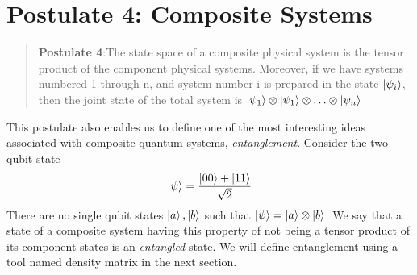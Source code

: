 \section{Postulate 4: Composite Systems}
\begin{quote}
    \textbf{Postulate 4}:The state space of a composite physical system is the tensor product of the component physical systems. Moreover, if we have systems numbered 1 through n, and system number i is prepared in the state $\ket{\psi_i}$, then the joint state of the total system is $\ket{\psi_1} \otimes \ket{\psi_1} \otimes \hdots \otimes \ket{\psi_n}$
\end{quote}

This postulate also enables us to define one of the most interesting ideas associated with composite quantum systems, \textit{entanglement}. Consider the two qubit state 
\begin{equation}
    \ket{\psi}=\frac{\ket{00}+\ket{11}}{\sqrt{2}}
\end{equation}
There are no single qubit states $\ket{a}, \ket{b}$ such that $\ket{\psi}=\ket{a}\otimes \ket{b}$. We say that a state of a composite system having this property of not being a tensor product of its component states is an \textit{entangled} state. We will define entanglement using a tool named density matrix in the next section.